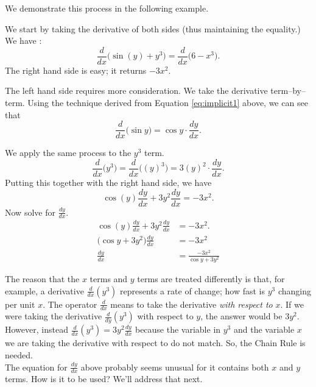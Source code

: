 We demonstrate this process in the following example.\\

{We start by taking the derivative of both sides (thus maintaining the equality.) We have :
$$ \frac{d}{dx}\Big(\sin(y) + y^3\Big)=\frac{d}{dx}\Big(6-x^3\Big).$$
The right hand side is easy; it returns $-3x^2$. 

The left hand side requires more consideration. We take the derivative term--by--term.  Using the technique derived from Equation \ref{eq:implicit1} above, we can see that $$\frac{d}{dx}\Big(\sin y\Big) = \cos y \cdot \frac{dy}{dx}.$$ %

We apply the same process to the $y^3$ term. 
$$\frac{d}{dx}\Big(y^3\Big) = \frac{d}{dx}\Big((y)^3\Big) = 3(y)^2\cdot \frac{dy}{dx}.$$
Putting this together with the right hand side, we have
$$\cos(y)\frac{dy}{dx}+3y^2\frac{dy}{dx} = -3x^2.$$
Now solve for $\frac{dy}{dx}$.
		\begin{align*}
		\cos(y)\frac{dy}{dx}+3y^2\frac{dy}{dx} 	&= -3x^2.\\
		\big(\cos y+3y^2\big)\frac{dy}{dx}&=	-3x^2\\
		\frac{dy}{dx}&=	\frac{-3x^2}{\cos y+3y^2}
		\end{align*}

The reason that the $x$ terms and $y$ terms are treated differently is that, for example, a derivative $\frac{d}{dx}\left(y^3\right)$ represents a rate of change; how fast is $y^3$ changing per unit $x$.  The operator $\frac{d}{dx}$ means to take the derivative \textit{with respect to} $x$.  If we were taking the derivative $\frac{d}{dy}\left(y^3\right)$ with respect to $y$, the answer would be $3y^2$.  However, instead $\frac{d}{dx}\left(y^3\right)=3y^2\frac{dy}{dx}$ because the variable in $y^3$ and the variable $x$ we are taking the derivative with respect to do not match.  So, the Chain Rule is needed.\\

The equation for $\frac{dy}{dx}$ above probably seems unusual for it contains both $x$ and $y$ terms. How is it to be used? We'll address that next.}\\

